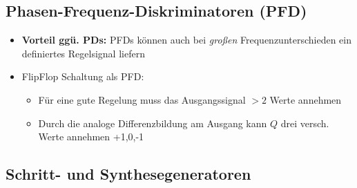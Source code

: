 \subsection{Phasen-Frequenz-Diskriminatoren (PFD)}
\begin{itemize}
    \itemsep0pt
    \item \textbf{Vorteil ggü. PDs:} PFDs können auch bei \textit{großen} Frequenzunterschieden ein definiertes Regelsignal liefern
    \item FlipFlop Schaltung als PFD:
        \begin{itemize}
            \itemsep0pt
            \item Für eine gute Regelung muss das Ausgangssignal $>2$ Werte annehmen
            \item Durch die analoge Differenzbildung am Ausgang kann $Q$ drei versch. Werte annehmen +1,0,-1
        \end{itemize}
\end{itemize}

\subsection{Schritt- und Synthesegeneratoren}
